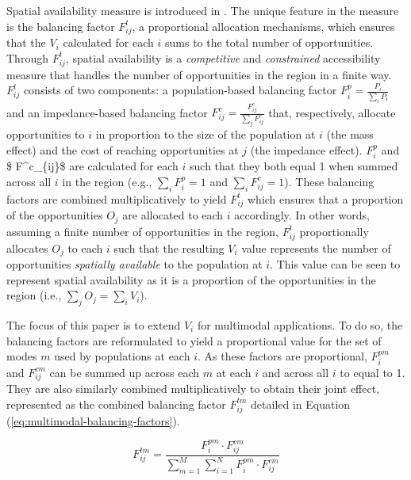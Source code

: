 \documentclass[numbered]{trbunofficial}
\begin{document}
Spatial availability measure is introduced in
\citet{soukhovIntroducingSpatialAvailability2023}. The unique feature in
the measure is the balancing factor \(F^t_{ij}\), a proportional
allocation mechanisms, which ensures that the \(V_i\) calculated for
each \(i\) sums to the total number of opportunities. Through
\(F^t_{ij}\), spatial availability is a \emph{competitive} and
\emph{constrained} accessibility measure that handles the number of
opportunities in the region in a finite way. \(F^t_{ij}\) consists of
two components: a population-based balancing factor
\(F^p_{i} = \frac{P_i}{\sum_i P_i}\) and an impedance-based balancing
factor \(F^c_{ij} = \frac{F^c_{ij}}{\sum_j F^c_{ij}}\) that,
respectively, allocate opportunities to \(i\) in proportion to the size
of the population at \(i\) (the mass effect) and the cost of reaching
opportunities at \(j\) (the impedance effect). \(F^p_{i}\) and \$
F\^{}c\_\{ij\}\$ are calculated for each \(i\) such that they both equal
1 when summed across all \(i\) in the region (e.g.,
\(\sum_i F^p_{i} = 1\) and \(\sum_i F^c_{ij} = 1\)). These balancing
factors are combined multiplicatively to yield \(F^t_{ij}\) which
ensures that a proportion of the opportunities \(O_j\) are allocated to
each \(i\) accordingly. In other words, assuming a finite number of
opportunities in the region, \(F^t_{ij}\) proportionally allocates
\(O_j\) to each \(i\) such that the resulting \(V_i\) value represents
the number of opportunities \emph{spatially available} to the population
at \(i\). This value can be seen to represent spatial availability as it
is a proportion of the opportunities in the region (i.e.,
\(\sum_j O_j = \sum_i V_i\)).

The focus of this paper is to extend \(V_i\) for multimodal
applications. To do so, the balancing factors are reformulated to yield
a proportional value for the set of modes \(m\) used by populations at
each \(i\). As these factors are proportional, \(F^{pm}_{i}\) and
\(F^{cm}_{ij}\) can be summed up across each \(m\) at each \(i\) and
across all \(i\) to equal to 1. They are also similarly combined
multiplicatively to obtain their joint effect, represented as the
combined balancing factor \(F^{tm}_{ij}\) detailed in Equation
(\ref{eq:multimodal-balancing-factors}).

\begin{equation}
\label{eq:multimodal-balancing-factors}
F^{tm}_{ij} = \frac{F^{pm}_{i} \cdot F^{cm}_{ij}}{\sum_{m=1}^M \sum_{i=1}^N F^{pm}_{i} \cdot F^{cm}_{ij}}
\end{equation}
\end{document}

